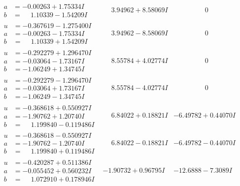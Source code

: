 \documentclass[1p]{elsarticle_modified}
\theoremstyle{definition}
\begin{document}
$$\begin{array}{c|c|c}
\begin{aligned}
a &= -0.00263 + 1.75334 I \\
b &= \phantom{-}1.10339 - 1.54209 I\end{aligned}
 & \phantom{-}3.94962 + 8.58069 I & \phantom{-0.000000 } 0 \\ \hline\begin{aligned}
u &= -0.367619 - 1.275400 I \\
a &= -0.00263 - 1.75334 I \\
b &= \phantom{-}1.10339 + 1.54209 I\end{aligned}
 & \phantom{-}3.94962 - 8.58069 I & \phantom{-0.000000 } 0 \\ \hline\begin{aligned}
u &= -0.292279 + 1.296470 I \\
a &= -0.03064 - 1.73167 I \\
b &= -1.06249 + 1.34745 I\end{aligned}
 & \phantom{-}8.55784 + 4.02774 I & \phantom{-0.000000 } 0 \\ \hline\begin{aligned}
u &= -0.292279 - 1.296470 I \\
a &= -0.03064 + 1.73167 I \\
b &= -1.06249 - 1.34745 I\end{aligned}
 & \phantom{-}8.55784 - 4.02774 I & \phantom{-0.000000 } 0 \\ \hline\begin{aligned}
u &= -0.368618 + 0.550927 I \\
a &= -1.90762 + 1.20740 I \\
b &= \phantom{-}1.199840 - 0.119486 I\end{aligned}
 & \phantom{-}6.84022 + 0.18821 I & -6.49782 + 0.44070 I \\ \hline\begin{aligned}
u &= -0.368618 - 0.550927 I \\
a &= -1.90762 - 1.20740 I \\
b &= \phantom{-}1.199840 + 0.119486 I\end{aligned}
 & \phantom{-}6.84022 - 0.18821 I & -6.49782 - 0.44070 I \\ \hline\begin{aligned}
u &= -0.420287 + 0.511386 I \\
a &= -0.055452 + 0.560232 I \\
b &= \phantom{-}1.072910 + 0.178946 I\end{aligned}
 & -1.90732 + 0.96795 I & -12.6888 - 7.3089 I \\ \hline\begin{aligned}

\end{aligned}
\end{array}$$
\end{document}
